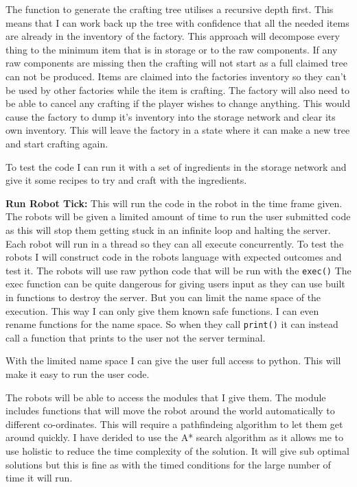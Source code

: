 \documentclass[12pt]{article}
\def\code#1{\texttt{#1}}
\begin{document}
The function to generate the crafting tree utilises a recursive depth first. This means that I can work back up the tree with confidence that all the needed items are already in the inventory of the factory. This approach will decompose every thing to the minimum item that is in storage or to the raw components. If any raw components are missing then the crafting will not start as a full claimed tree can not be produced.
Items are claimed into the factories inventory so they can't be used by other factories while the item is crafting.
The factory will also need to be able to cancel any crafting if the player wishes to change anything. This would cause the factory to dump it's inventory into the storage network and clear its own inventory. This will leave the factory in a state where it can make a new tree and start crafting again.

To test the code I can run it with a set of ingredients in the storage network and give it some recipes to try and craft with the ingredients. 

\textbf{Run Robot Tick:}
This will run the code in the robot in the time frame given. The robots will be given a limited amount of time to run the user submitted code as this will stop them getting stuck in an infinite loop and halting the server.
Each robot will run in a thread so they can all execute concurrently. To test the robots I will construct code in the robots language with expected outcomes and test it. The robots will use raw python code that will be run with the \code{exec()} The exec function can be quite dangerous for giving users input as they can use built in functions to destroy the server. But you can limit the name space of the execution. This way I can only give them known safe functions. I can even rename functions for the name space. So when they call \code{print()} it can instead call a function that prints to the user not the server terminal.

With the limited name space I can give the user full access to python. This will make it easy to run the user code.

The robots will be able to access the modules that I give them. The module includes functions that will move the robot around the world automatically to different co-ordinates. This will require a pathfindeing algorithm to let them get around quickly. I have derided to use the A* search algorithm as it allows me to use holistic to reduce the time complexity of the solution. It will give sub optimal solutions but this is fine as with the timed conditions for the large number of time it will run.
\end{document}
